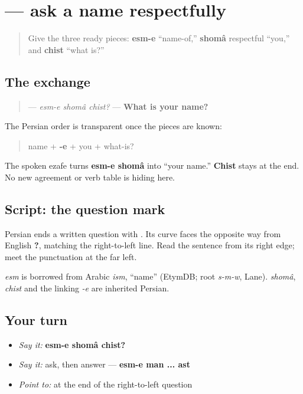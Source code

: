 \section[\texorpdfstring{\fa{اسم} \fa{شما} \fa{چیست؟} (esm-e shomâ chist?)}{اسم شما چیست؟ (esm-e shomâ chist?)}]{   — ask a name respectfully}

\label{lesson:FA-C03-esm-e-shoma-chist}



\begin{quote}
Give the three ready pieces: \textbf{esm-e} “name-of,” \textbf{shomâ} respectful “you,” and \textbf{chist} “what is?”
\end{quote}

\subsection*{The exchange}
\begin{quote}
\textbf{  } — \emph{esm-e shomâ chist?} — \textbf{What is your name?}
\end{quote}

The Persian order is transparent once the pieces are known:

\begin{quote}
name + \textbf{-e} + you + what-is?
\end{quote}

The spoken ezafe turns \textbf{esm-e shomâ} into “your name.” \textbf{Chist} stays at the end. No new agreement or verb table is hiding here.

\subsection*{Script: the question mark}
Persian ends a written question with \textbf{}. Its curve faces the opposite way from English \textbf{?}, matching the right-to-left line. Read the sentence from its right edge; meet the punctuation at the far left.

\begin{cousinweb}
\emph{esm} is borrowed from Arabic \emph{ism}, \textquotedblleft{}name\textquotedblright{} (EtymDB; root \emph{s-m-w}, Lane). \emph{shomâ}, \emph{chist} and the linking \emph{-e} are inherited Persian.
\end{cousinweb}

\subsection*{Your turn}
\begin{itemize}
\raggedright
  \item \emph{Say it:} \textbf{esm-e shomâ chist?}
  \item \emph{Say it:} ask, then answer — \textbf{esm-e man ... ast}
  \item \emph{Point to:} \textbf{} at the end of the right-to-left question
\end{itemize}


